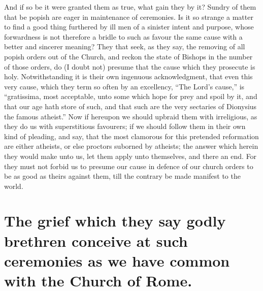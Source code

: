 And if so be it were granted them as true, what gain they by it? Sundry of them that be popish are eager in maintenance of ceremonies. Is it so strange a matter to find a good thing furthered by ill men of a sinister intent and purpose, whose forwardness is not therefore a bridle to such as favour the same cause with a better and sincerer meaning? They that seek, as they say, the removing of all popish orders out of the Church, and reckon the state of Bishops in the number of those orders, do (I doubt not) presume that the cause which they prosecute is holy. Notwithstanding it is their own ingenuous acknowledgment, that even this very cause, which they term so often by an excellency, “The Lord’s cause,” is “gratissima, most acceptable, unto some which hope for prey and spoil by it, and that our age hath store of such, and that such are the very sectaries of Dionysius the famous atheist.” Now if hereupon we should upbraid them with irreligious, as they do us with superstitious favourers; if we should follow them in their own kind of pleading, and say, that the most clamorous for this pretended reformation are either atheists, or else proctors suborned by atheists; the answer which herein they  would make unto us, let them apply unto themselves, and there an end. For they must not forbid us to presume our cause in defence of our church orders to be as good as theirs against them, till the contrary be made manifest to the world.

\section*{The grief which they say godly brethren conceive at such ceremonies as we have common with the Church of Rome.}

